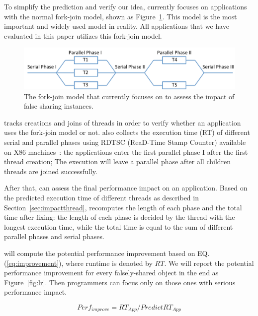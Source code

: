 To simplify the prediction and verify our idea, \cheetah{} currently focuses on applications with the normal fork-join model, shown as Figure~\ref{fig:forkjoinmodel}. This model is the most important and widely used model in reality. All applications that we have evaluated in this paper utilizes this fork-join model. 

\begin{figure}[ht!]
\begin{center}
\includegraphics[width=6in]{figure/forkjoin}
\end{center}
\caption{The fork-join model that \Cheetah{} currently focuses on to assess the impact of false sharing instances. 
\label{fig:forkjoinmodel}}
\end{figure}

\cheetah{} tracks creations and joins of threads in order to verify whether an application uses the fork-join model or not. \Cheetah{} also collects the execution time (RT) of different serial and parallel phases using RDTSC (ReaD-Time Stamp Counter) available on X86 machines~\cite{rtdsc}: the applications enter the first parallel phase I after the first thread creation; The execution will leave a parallel phase after all children threads are joined successfully. 

After that, \cheetah{} can assess the final performance impact on an application. Based on the predicted execution time of different threads as described in Section~\ref{sec:impactthread}, \cheetah{} recomputes the length of each phase and the total time after fixing: the length of each phase is decided by the thread with the longest execution time, while the total time is equal to the sum of different parallel phases and serial phases. 

\cheetah{} will compute the potential performance improvement based on EQ.(\ref{eq:improvement}), where runtime is denoted by $RT$. We will report the potential performance improvement for every falsely-shared object in the end as Figure~\ref{fig:lr}. Then programmers can focus only on those ones with serious performance impact. 

\begin{equation}
\label{eq:improvement}
Perf_{improve}= RT_{App} / PredictRT_{App}
\end{equation}

